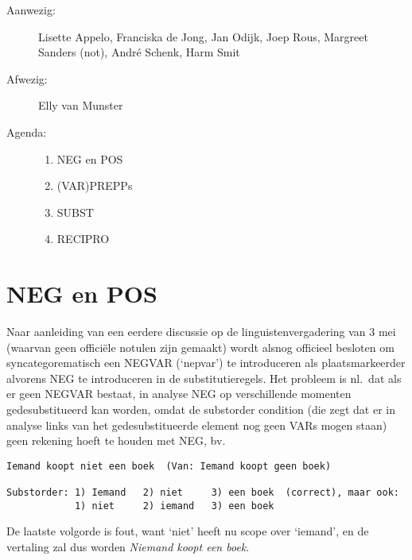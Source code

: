 

   \RosSupersedes{-}
   \MakeRosTitle
%
%
\begin{description}
\item[Aanwezig:] Lisette Appelo, Franciska de Jong, 
                 Jan Odijk, Joep Rous, Margreet Sanders (not),
                 Andr\'{e} Schenk, Harm Smit
\item[Afwezig:] Elly van Munster
\item[Agenda:]\mbox{}
  \begin{enumerate}
  \item NEG en POS
  \item (VAR)PREPPs
  \item SUBST
  \item RECIPRO
  \end{enumerate}
\end{description}

\section{NEG en POS}
Naar aanleiding van een eerdere discussie op de linguistenvergadering van 3
mei (waarvan geen offici\"{e}le notulen zijn gemaakt) wordt alsnog officieel 
besloten om 
syncategorematisch een NEGVAR (`nepvar') te introduceren als plaatsmarkeerder 
alvorens NEG te introduceren in de substitutieregels. 
Het probleem is nl.\ dat als er geen NEGVAR bestaat, in analyse NEG op 
verschillende momenten gedesubstitueerd kan worden, omdat de substorder 
condition (die zegt dat er in analyse links van het gedesubstitueerde element 
nog geen VARs mogen staan) geen rekening hoeft te houden met NEG, bv.\\
\begin{verbatim}
Iemand koopt niet een boek  (Van: Iemand koopt geen boek)

Substorder: 1) Iemand   2) niet     3) een boek  (correct), maar ook:
            1) niet     2) iemand   3) een boek

\end{verbatim}
De laatste volgorde is fout, want `niet' heeft nu scope over `iemand', en de 
vertaling zal dus worden {\em Niemand koopt een boek\/}.

